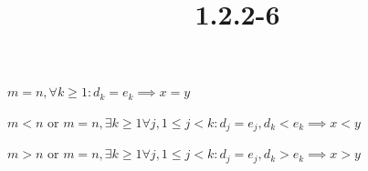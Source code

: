 \documentclass{article}
\title{1.2.2-6}
\begin{document}
\maketitle

\( m = n, \forall k \geq 1: d_k = e_k \implies x = y \)

\( m < n \) or \( m = n, \exists k \geq 1 \forall j, 1 \leq j < k: d_j = e_j, d_k < e_k \implies x < y \)

\( m > n \) or \( m = n, \exists k \geq 1 \forall j, 1 \leq j < k: d_j = e_j, d_k > e_k \implies x > y \)
\end{document}
